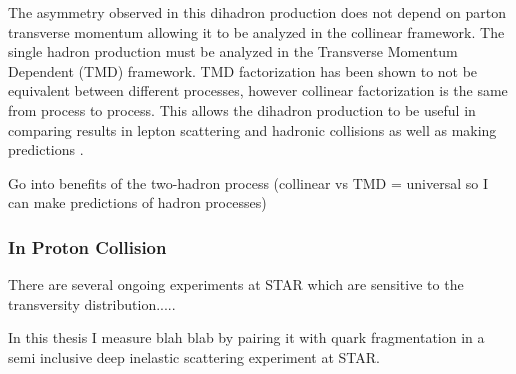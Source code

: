 \documentclass[abstract = on,listof=totoc, bibliography=totoc]{scrreprt}
\begin{document}
The asymmetry observed in this dihadron production does not depend on parton transverse momentum allowing it to be analyzed in the collinear framework. The single hadron production must be analyzed in the Transverse Momentum Dependent (TMD) framework. TMD factorization has been shown to not be equivalent between different processes, however collinear factorization is the same from process to process. This allows the dihadron production to be useful in comparing results in lepton scattering and hadronic collisions as well as making predictions \cite{univTrans}.  
  
Go into benefits of the two-hadron process (collinear vs TMD = universal so I can make predictions of hadron processes)

\subsubsection{In Proton Collision}
There are several ongoing experiments at STAR which are sensitive to the transversity distribution.....




In this thesis I measure blah blab by pairing it with quark fragmentation in a semi inclusive deep inelastic scattering experiment at STAR.
\end{document}
